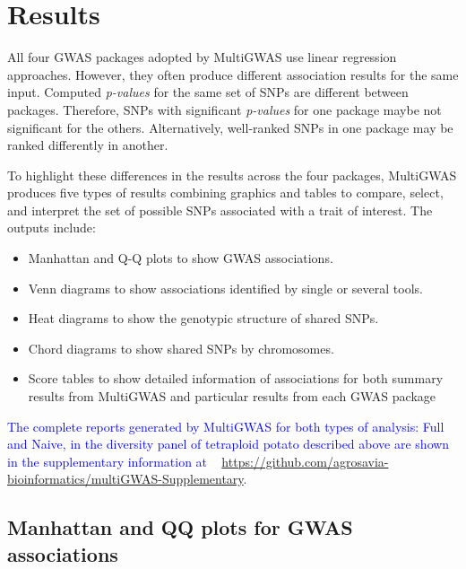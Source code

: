 \documentclass{article}
\begin{document}
\section{Results}
All four GWAS packages adopted by MultiGWAS use linear regression approaches. However, they often produce different association results for the same input. Computed \emph{p-values }for the same set of SNPs are different between packages. Therefore, SNPs with significant \emph{p-values} for one package maybe not significant for the others. Alternatively, well-ranked SNPs in one package may be ranked differently in another. 

To highlight these differences in the results across the four packages, MultiGWAS produces five types of results combining graphics and tables to compare, select, and interpret the set of possible SNPs associated with a trait of interest. The outputs include: 
\begin{itemize}
\item Manhattan and Q-Q plots to show GWAS associations. 
\item Venn diagrams to show associations identified by single or several tools.
\item Heat diagrams to show the genotypic structure of shared SNPs.
\item Chord diagrams to show shared SNPs by chromosomes.
\item Score tables to show detailed information of associations for both summary results from MultiGWAS and particular results from each GWAS
package
\end{itemize}

\textcolor{blue}{The complete reports generated by MultiGWAS for both types of analysis: Full and Naive, in the diversity panel of tetraploid potato described above are shown in the supplementary information at ~ \url{https://github.com/agrosavia-bioinformatics/multiGWAS-Supplementary}.}




\subsection{Manhattan and QQ plots for GWAS associations }
\end{document}
